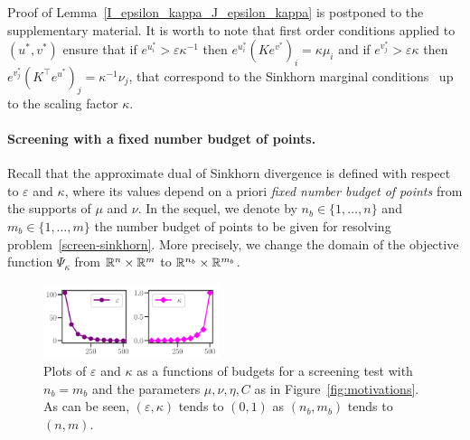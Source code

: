 Proof of Lemma~\ref{I_epsilon_kappa_J_epsilon_kappa} is postponed to the supplementary material. It is worth to note that first order conditions applied to $(u^{*}, v^{*})$ ensure that if $e^{u^{*}_i} > \varepsilon\kappa^{-1}$ then $e^{u^{*}_i} (Ke^{v^{*}})_i =  \kappa\mu_i$ and if $e^{v^{*}_j} > \varepsilon\kappa$ then $e^{v^{*}_j} (K^\top e^{u^{*}})_j =  \kappa^{-1}\nu_j$, that correspond to the Sinkhorn marginal conditions~\cite{peyre2019COTnowpublisher} up to the scaling factor $\kappa$. 

\paragraph{Screening with a fixed number budget of points.}

Recall that the approximate dual of Sinkhorn divergence is defined with respect to $\varepsilon$ and $\kappa$, where its values depend on a priori \emph{fixed number budget of points} from the supports of $\mu$ and $\nu$.
In the sequel, we denote by $n_b \in\{1, \ldots, n\}$ and $m_b\in\{1, \ldots, m\}$ the number budget of points to be given for resolving problem~\eqref{screen-sinkhorn}. More precisely, we change the domain of the objective function $\Psi_\kappa$ from ${\mathbb{R}}^n \times {\mathbb{R}}^m$ to ${\mathbb{R}}^{n_b} \times {\mathbb{R}}^{m_b}$.

\begin{figure}
\vspace{-18pt}
\centering
\includegraphics[width=0.46\textwidth]{./figs/kappa_epsilon.pdf}
\caption{Plots of $\varepsilon$ and $\kappa$ as a functions of budgets for a screening test with $n_b=m_b$ and the parameters $\mu, \nu, \eta, C$ as in Figure~\eqref{fig:motivations}. As can be seen, $(\varepsilon, \kappa)$ tends to $(0,1)$ as $(n_b,m_b)$ tends to $(n,m)$.}
\label{fig:kappa_epsilon}
\vspace{-15pt}
\end{figure}

